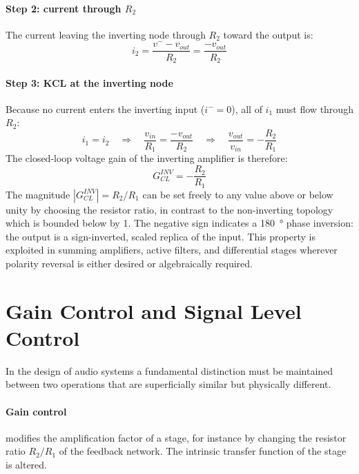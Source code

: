 \paragraph{Step 2: current through \( R_2 \)} The current leaving the inverting node through \( R_2 \) toward the output is:
\[
i_2 = \frac{v^{-} - v_{out}}{R_2} = \frac{-v_{out}}{R_2}
\]

\paragraph{Step 3: KCL at the inverting node} Because no current enters the inverting input (\( i^{-} = 0 \)), all of \( i_1 \) must flow through \( R_2 \):
\[
i_1 = i_2
\quad\Longrightarrow\quad
\frac{v_{in}}{R_1} = \frac{-v_{out}}{R_2}
\quad\Longrightarrow\quad
\frac{v_{out}}{v_{in}} = -\frac{R_2}{R_1}
\]
The closed-loop voltage gain of the inverting amplifier is therefore:
\[
G_{CL}^{INV} = -\frac{R_2}{R_1}
\]
The magnitude \( |G_{CL}^{INV}| = R_2/R_1 \) can be set freely to any value above or below unity by choosing the resistor ratio, in contrast to the non-inverting topology which is bounded below by 1. The negative sign indicates a \SI{180}{\degree} phase inversion: the output is a sign-inverted, scaled replica of the input. This property is exploited in summing amplifiers, active filters, and differential stages wherever polarity reversal is either desired or algebraically required.

\section{Gain Control and Signal Level Control}
\label{sc:210}

In the design of audio systems a fundamental distinction must be maintained between two operations that are superficially similar but physically different.

\paragraph{Gain control} modifies the amplification factor of a stage, for instance by changing the resistor ratio \( R_2/R_1 \) of the feedback network. The intrinsic transfer function of the stage is altered.

